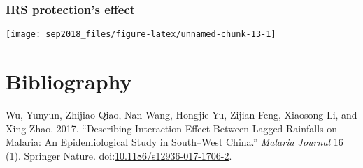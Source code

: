 \documentclass[]{article}
\begin{document}
\subsubsection{IRS protection's effect}\label{irs-protections-effect}

\begin{center}\texttt{[image: sep2018\_files/figure-latex/unnamed-chunk-13-1]} \end{center}

\section*{Bibliography}\label{bibliography}

\hypertarget{refs}{}
\hypertarget{ref-Wu_2017}{}
Wu, Yunyun, Zhijiao Qiao, Nan Wang, Hongjie Yu, Zijian Feng, Xiaosong
Li, and Xing Zhao. 2017. ``Describing Interaction Effect Between Lagged
Rainfalls on Malaria: An Epidemiological Study in South--West China.''
\emph{Malaria Journal} 16 (1). Springer Nature.
doi:\href{https://doi.org/10.1186/s12936-017-1706-2}{10.1186/s12936-017-1706-2}.
\end{document}
